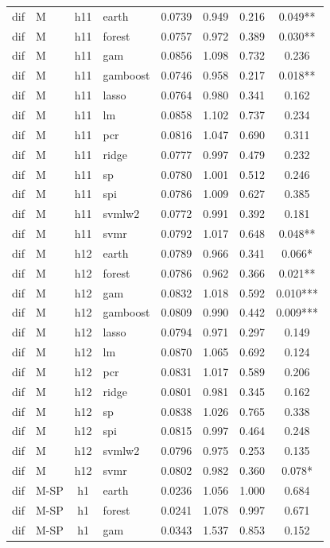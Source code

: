 \begin{ThreePartTable}
\begin{longtable}[t]{llclcccc}
\addlinespace
dif & M & h11 & earth & 0.0739 & 0.949 & 0.216 & 0.049**\\
dif & M & h11 & forest & 0.0757 & 0.972 & 0.389 & 0.030**\\
dif & M & h11 & gam & 0.0856 & 1.098 & 0.732 & 0.236\\
dif & M & h11 & gamboost & 0.0746 & 0.958 & 0.217 & 0.018**\\
dif & M & h11 & lasso & 0.0764 & 0.980 & 0.341 & 0.162\\
dif & M & h11 & lm & 0.0858 & 1.102 & 0.737 & 0.234\\
dif & M & h11 & pcr & 0.0816 & 1.047 & 0.690 & 0.311\\
dif & M & h11 & ridge & 0.0777 & 0.997 & 0.479 & 0.232\\
dif & M & h11 & sp & 0.0780 & 1.001 & 0.512 & 0.246\\
dif & M & h11 & spi & 0.0786 & 1.009 & 0.627 & 0.385\\
dif & M & h11 & svmlw2 & 0.0772 & 0.991 & 0.392 & 0.181\\
dif & M & h11 & svmr & 0.0792 & 1.017 & 0.648 & 0.048**\\
\addlinespace
dif & M & h12 & earth & 0.0789 & 0.966 & 0.341 & 0.066*\\
dif & M & h12 & forest & 0.0786 & 0.962 & 0.366 & 0.021**\\
dif & M & h12 & gam & 0.0832 & 1.018 & 0.592 & 0.010***\\
dif & M & h12 & gamboost & 0.0809 & 0.990 & 0.442 & 0.009***\\
dif & M & h12 & lasso & 0.0794 & 0.971 & 0.297 & 0.149\\
dif & M & h12 & lm & 0.0870 & 1.065 & 0.692 & 0.124\\
dif & M & h12 & pcr & 0.0831 & 1.017 & 0.589 & 0.206\\
dif & M & h12 & ridge & 0.0801 & 0.981 & 0.345 & 0.162\\
dif & M & h12 & sp & 0.0838 & 1.026 & 0.765 & 0.338\\
dif & M & h12 & spi & 0.0815 & 0.997 & 0.464 & 0.248\\
dif & M & h12 & svmlw2 & 0.0796 & 0.975 & 0.253 & 0.135\\
dif & M & h12 & svmr & 0.0802 & 0.982 & 0.360 & 0.078*\\
\addlinespace
dif & M-SP & h1 & earth & 0.0236 & 1.056 & 1.000 & 0.684\\
dif & M-SP & h1 & forest & 0.0241 & 1.078 & 0.997 & 0.671\\
dif & M-SP & h1 & gam & 0.0343 & 1.537 & 0.853 & 0.152\\

\end{longtable}
\end{ThreePartTable}
